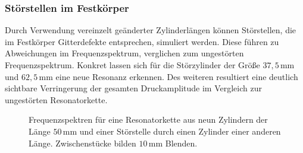 \subsubsection*{Störstellen im Festkörper}
Durch Verwendung vereinzelt geänderter Zylinderlängen können Störstellen, die im Festkörper Gitterdefekte entsprechen, simuliert werden.
Diese führen zu Abweichungen im Frequenzspektrum, verglichen zum ungestörten Frequenzspektrum.
Konkret lassen sich für die Störzylinder der Größe $37,5\,$mm und $62,5\,$mm eine neue Resonanz erkennen. Des weiteren resultiert eine
deutlich sichtbare Verringerung der gesamten Druckamplitude im Vergleich zur ungestörten Resonatorkette. 

\begin{figure}[H]
    \centering
    \hfil
    \hfil 
    \caption{Frequenzspektren für eine Resonatorkette aus neun Zylindern der Länge $50\,$mm und einer Störstelle durch einen Zylinder einer anderen Länge. Zwischenstücke bilden $10\,$mm Blenden.}
    \label{fig:fest_stoer}
\end{figure}

